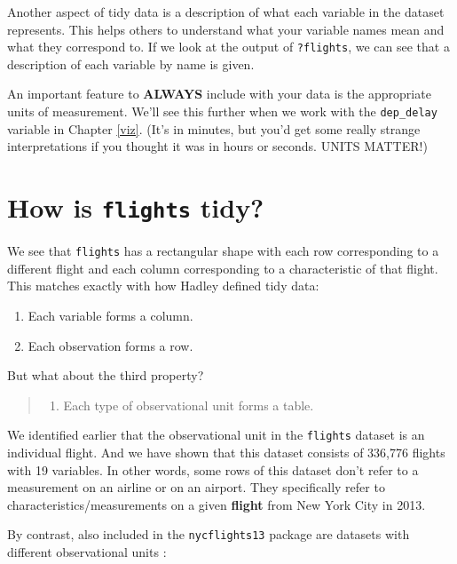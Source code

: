 \documentclass[]{tufte-book}
\providecommand{\tightlist}{%
  \setlength{\itemsep}{0pt}\setlength{\parskip}{0pt}}
\begin{document}
Another aspect of tidy data is a description of what each variable in
the dataset represents. This helps others to understand what your
variable names mean and what they correspond to. If we look at the
output of \texttt{?flights}, we can see that a description of each
variable by name is given.

An important feature to \textbf{ALWAYS} include with your data is the
appropriate units of measurement. We'll see this further when we work
with the \texttt{dep\_delay} variable in Chapter \ref{viz}. (It's in
minutes, but you'd get some really strange interpretations if you
thought it was in hours or seconds. UNITS MATTER!)

\section{\texorpdfstring{How is \texttt{flights}
tidy?}{How is flights tidy?}}\label{how-is-flights-tidy}

We see that \texttt{flights} has a rectangular shape with each row
corresponding to a different flight and each column corresponding to a
characteristic of that flight. This matches exactly with how Hadley
defined tidy data:

\begin{enumerate}
\def\labelenumi{\arabic{enumi}.}
\tightlist
\item
  Each variable forms a column.
\item
  Each observation forms a row.
\end{enumerate}

But what about the third property?

\begin{quote}
\begin{enumerate}
\def\labelenumi{\arabic{enumi}.}
\setcounter{enumi}{2}
\tightlist
\item
  Each type of observational unit forms a table.
\end{enumerate}
\end{quote}

We identified earlier that the observational unit in the
\texttt{flights} dataset is an individual flight. And we have shown that
this dataset consists of 336,776 flights with 19 variables. In other
words, some rows of this dataset don't refer to a measurement on an
airline or on an airport. They specifically refer to
characteristics/measurements on a given \textbf{flight} from New York
City in 2013.

By contrast, also included in the \texttt{nycflights13} package are
datasets with different observational units \citep{R-nycflights13}:
\end{document}
